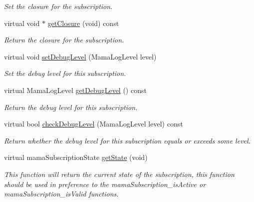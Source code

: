 \begin{DoxyCompactItemize}
\begin{DoxyCompactList}\small\item\em Set the closure for the subscription. \item\end{DoxyCompactList}\item 
virtual void $\ast$ \hyperlink{classWombat_1_1MamaBasicSubscription_a601750648cc71247df752f904aaf5e1c}{getClosure} (void) const 
\begin{DoxyCompactList}\small\item\em Return the closure for the subscription. \item\end{DoxyCompactList}\item 
virtual void \hyperlink{classWombat_1_1MamaBasicSubscription_a1cf68138c6df48e9bb5fbfa1e4242fb5}{setDebugLevel} (MamaLogLevel level)
\begin{DoxyCompactList}\small\item\em Set the debug level for this subscription. \item\end{DoxyCompactList}\item 
virtual MamaLogLevel \hyperlink{classWombat_1_1MamaBasicSubscription_a7ed1a681895a09661866d56682b9faba}{getDebugLevel} () const 
\begin{DoxyCompactList}\small\item\em Return the debug level for this subscription. \item\end{DoxyCompactList}\item 
virtual bool \hyperlink{classWombat_1_1MamaBasicSubscription_aa87899a7475f0b88dd4b99ea4ddb963e}{checkDebugLevel} (MamaLogLevel level) const 
\begin{DoxyCompactList}\small\item\em Return whether the debug level for this subscription equals or exceeds some level. \item\end{DoxyCompactList}\item 
virtual mamaSubscriptionState \hyperlink{classWombat_1_1MamaBasicSubscription_a0cbca1e081927c0fec67de8a9b929f9c}{getState} (void)
\begin{DoxyCompactList}\small\item\em This function will return the current state of the subscription, this function should be used in preference to the mamaSubscription\_\-isActive or mamaSubscription\_\-isValid functions. \item\end{DoxyCompactList}\end{DoxyCompactItemize}
